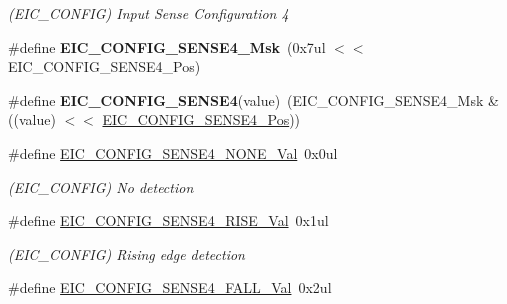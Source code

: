 \begin{DoxyCompactItemize}
\begin{DoxyCompactList}\small\item\em (E\+I\+C\+\_\+\+C\+O\+N\+F\+I\+G) Input Sense Configuration 4 \end{DoxyCompactList}\item 
\hypertarget{group___s_a_m_l21___e_i_c_ga3547b0433af586c98918da630dc3a997}{}\#define {\bfseries E\+I\+C\+\_\+\+C\+O\+N\+F\+I\+G\+\_\+\+S\+E\+N\+S\+E4\+\_\+\+Msk}~(0x7ul $<$$<$ E\+I\+C\+\_\+\+C\+O\+N\+F\+I\+G\+\_\+\+S\+E\+N\+S\+E4\+\_\+\+Pos)\label{group___s_a_m_l21___e_i_c_ga3547b0433af586c98918da630dc3a997}

\item 
\hypertarget{group___s_a_m_l21___e_i_c_ga772ab24259c926229113844e9dbaa99e}{}\#define {\bfseries E\+I\+C\+\_\+\+C\+O\+N\+F\+I\+G\+\_\+\+S\+E\+N\+S\+E4}(value)~(E\+I\+C\+\_\+\+C\+O\+N\+F\+I\+G\+\_\+\+S\+E\+N\+S\+E4\+\_\+\+Msk \& ((value) $<$$<$ \hyperlink{group___s_a_m_l21___e_i_c_gad23c76b1fbf7d30fa3aa738a38c453c3}{E\+I\+C\+\_\+\+C\+O\+N\+F\+I\+G\+\_\+\+S\+E\+N\+S\+E4\+\_\+\+Pos}))\label{group___s_a_m_l21___e_i_c_ga772ab24259c926229113844e9dbaa99e}

\item 
\hypertarget{group___s_a_m_l21___e_i_c_ga4317fae5e621e618c7e7bdf654a1b2b0}{}\#define \hyperlink{group___s_a_m_l21___e_i_c_ga4317fae5e621e618c7e7bdf654a1b2b0}{E\+I\+C\+\_\+\+C\+O\+N\+F\+I\+G\+\_\+\+S\+E\+N\+S\+E4\+\_\+\+N\+O\+N\+E\+\_\+\+Val}~0x0ul\label{group___s_a_m_l21___e_i_c_ga4317fae5e621e618c7e7bdf654a1b2b0}

\begin{DoxyCompactList}\small\item\em (E\+I\+C\+\_\+\+C\+O\+N\+F\+I\+G) No detection \end{DoxyCompactList}\item 
\hypertarget{group___s_a_m_l21___e_i_c_gaad52f78c0fc34ba713282c4f2cb52965}{}\#define \hyperlink{group___s_a_m_l21___e_i_c_gaad52f78c0fc34ba713282c4f2cb52965}{E\+I\+C\+\_\+\+C\+O\+N\+F\+I\+G\+\_\+\+S\+E\+N\+S\+E4\+\_\+\+R\+I\+S\+E\+\_\+\+Val}~0x1ul\label{group___s_a_m_l21___e_i_c_gaad52f78c0fc34ba713282c4f2cb52965}

\begin{DoxyCompactList}\small\item\em (E\+I\+C\+\_\+\+C\+O\+N\+F\+I\+G) Rising edge detection \end{DoxyCompactList}\item 
\hypertarget{group___s_a_m_l21___e_i_c_ga4fe8ad8e7d22ba42d070d9108213d907}{}\#define \hyperlink{group___s_a_m_l21___e_i_c_ga4fe8ad8e7d22ba42d070d9108213d907}{E\+I\+C\+\_\+\+C\+O\+N\+F\+I\+G\+\_\+\+S\+E\+N\+S\+E4\+\_\+\+F\+A\+L\+L\+\_\+\+Val}~0x2ul\label{group___s_a_m_l21___e_i_c_ga4fe8ad8e7d22ba42d070d9108213d907}


\end{DoxyCompactItemize}
